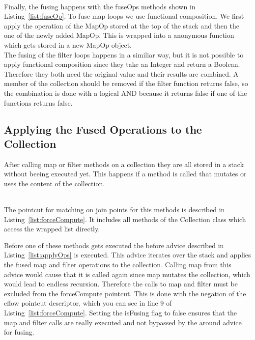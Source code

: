 \documentclass[runningheads,a4paper]{llncs}
\begin{document}
\lstset{caption=The fuseOp methods for MapOp and FilterOp objects. They combine the anonymous functions of both objects by functional composition or with logical and., language=Java, label=list:fuseOp}

\\
Finally, the fusing happens with the fuseOps methods shown in Listing~\ref{list:fuseOp}. To fuse map loops we use functional composition. We first apply the operation of the MapOp stored at the top of the stack and then the one of the newly added MapOp.
This is wrapped into a anonymous function which gets stored in a new MapOp object.\\
The fusing of the filter loops happens in a similiar way, but it is not possible to apply functional composition since they take an Integer and return a Boolean.
Therefore they both need the original value and their results are combined.
A member of the collection should be removed if the filter function returns false, so the combination is done with a logical AND because it returns false if one of the functions returns false.

\subsection{Applying the Fused Operations to the Collection} \label{sub:applying-ops}
After calling map or filter methods on a collection they are all stored in a stack without beeing executed yet. This happens if a method is called that mutates or uses the content of the collection.
\lstset{caption=Pointcut for methods which reference to or mutate the inner list of the collection directly., language=AspectJ, label=list:forceCompute}

\\
The pointcut for matching on join points for this methods is described in Listing~\ref{list:forceCompute}.
It includes all methods of the Collection class which access the wrapped list directly.
\\
\lstset{caption=Advice code which executes the stored operations., language=AspectJ, label=list:applyOps}

Before one of these methods gets executed the before advice described in Listing~\ref{list:applyOps} is executed.
This advice iterates over the stack and applies the fused map and filter operations to the collection.
Calling map from this advice would cause that it is called again since map mutates the collection, which would lead to endless recursion.
Therefore the calls to map and filter must be excluded from the forceCompute pointcut.
This is done with the negation of the cflow pointcut descriptor, which you can see in line 9 of Listing~\ref{list:forceCompute}.
Setting the isFusing flag to false ensures that the map and filter calls are really executed and not bypassed by the around advice for fusing.
\end{document}

